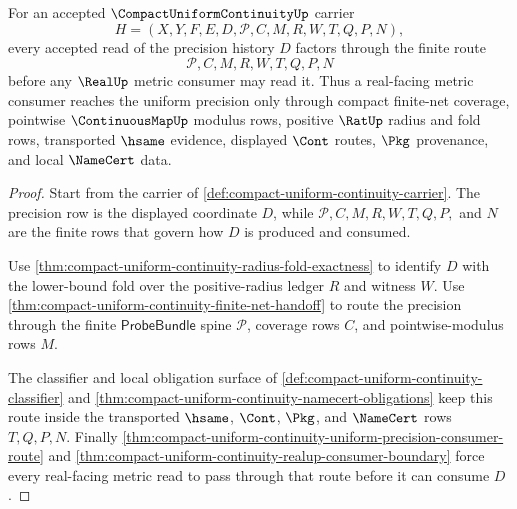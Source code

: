 \begin{theorem}
\label{thm:compact-uniform-continuity-precision-route-totality}
For an accepted $\CompactUniformContinuityUp$ carrier
$$
H=(X,Y,F,E,D,\mathcal{P},C,M,R,W,T,Q,P,N),
$$
every accepted read of the precision history $D$ factors through the finite route
$$
\mathcal{P}, C, M, R, W, T, Q, P, N
$$
before any $\RealUp$ metric consumer may read it. Thus a real-facing metric consumer reaches the uniform precision only through compact finite-net coverage, pointwise $\ContinuousMapUp$ modulus rows, positive $\RatUp$ radius and fold rows, transported $\hsame$ evidence, displayed $\Cont$ routes, $\Pkg$ provenance, and local $\NameCert$ data.
\end{theorem}
\begin{proof}
Start from the carrier of \autoref{def:compact-uniform-continuity-carrier}. The precision row is the displayed coordinate $D$, while $\mathcal{P}, C, M, R, W, T, Q, P,$ and $N$ are the finite rows that govern how $D$ is produced and consumed.

Use \autoref{thm:compact-uniform-continuity-radius-fold-exactness} to identify $D$ with the lower-bound fold over the positive-radius ledger $R$ and witness $W$. Use \autoref{thm:compact-uniform-continuity-finite-net-handoff} to route the precision through the finite $\mathsf{ProbeBundle}$ spine $\mathcal{P}$, coverage rows $C$, and pointwise-modulus rows $M$.

The classifier and local obligation surface of \autoref{def:compact-uniform-continuity-classifier} and \autoref{thm:compact-uniform-continuity-namecert-obligations} keep this route inside the transported $\hsame$, $\Cont$, $\Pkg$, and $\NameCert$ rows $T,Q,P,N$. Finally \autoref{thm:compact-uniform-continuity-uniform-precision-consumer-route} and \autoref{thm:compact-uniform-continuity-realup-consumer-boundary} force every real-facing metric read to pass through that route before it can consume $D$.
\end{proof}

